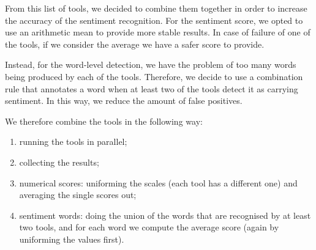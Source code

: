 From this list of tools, we decided to combine them together in order to increase the accuracy of the sentiment recognition. %
For the sentiment score, we opted to use an arithmetic mean to provide more stable results.
In case of failure of one of the tools, if we consider the average we have a safer score to provide.

Instead, for the word-level detection, we have the problem of too many words being produced by each of the tools.
Therefore, we decide to use a combination rule that annotates a word when at least two of the tools detect it as carrying sentiment.
In this way, we reduce the amount of false positives.

We therefore combine the tools in the following way:
\begin{enumerate}
    \item running the tools in parallel;
    \item collecting the results;
    \item numerical scores: uniforming the scales (each tool has a different one) and averaging the single scores out;
    \item sentiment words: doing the union of the words that are recognised by at least two tools, and for each word we compute the average score (again by uniforming the values first).
\end{enumerate}

